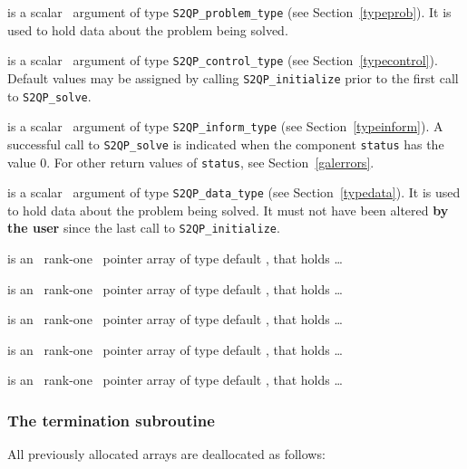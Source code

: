 \documentclass{galahad}
\newcommand{\packagename}{S2QP}
\begin{document}
\vspace*{-3mm}
\begin{description}
 is a scalar \intentinout\ argument of type 
{\tt \packagename\_problem\_type}
(see Section~\ref{typeprob}). 
It is used to hold data about the problem being solved.

 is a scalar \intentin\ argument of type 
{\tt \packagename\_control\_type}
(see Section~\ref{typecontrol}). Default values may be assigned by calling 
{\tt \packagename\_initialize} 
prior to the first call to 
{\tt \packagename\_solve}.

 is a scalar \intentout\ argument of type 
{\tt \packagename\_inform\_type}
(see Section~\ref{typeinform}). A successful call to
{\tt \packagename\_solve}
is indicated when the  component {\tt status} has the value 0. 
For other return values of {\tt status}, see Section~\ref{galerrors}.

 is a scalar \intentinout\ argument of type 
{\tt \packagename\_data\_type}
(see Section~\ref{typedata}). It is used to hold data about the problem being 
solved. It must not have been altered {\bf by the user} since the last call to 
{\tt \packagename\_initialize}.


 is an \optional\ rank-one \intentin\ pointer array of type 
 default \realdp,  that holds \ldots

 is an \optional\ rank-one \intentin\ pointer array of type 
 default \realdp,  that holds \ldots

 is an \optional\ rank-one \intentin\ pointer array of type 
 default \realdp,  that holds \ldots

 is an \optional\ rank-one \intentin\ pointer array of type 
 default \realdp,  that holds \ldots

 is an \optional\ rank-one \intentin\ pointer array of type 
 default \realdp,  that holds \ldots

\end{description}


\subsubsection{The  termination subroutine}
All previously allocated arrays are deallocated as follows:
\vspace*{1mm}
\end{document}
